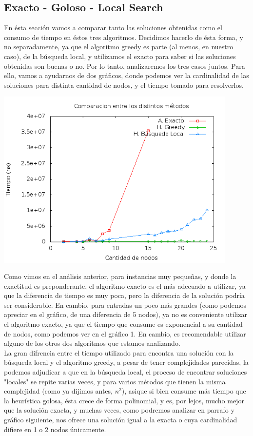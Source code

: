 \subsection{Exacto - Goloso - Local Search}
En ésta sección vamos a comparar tanto las soluciones obtenidas como el consumo de tiempo en éstos tres algoritmos. Decidimos hacerlo de ésta forma, y no separadamente, ya que el algoritmo greedy es parte (al menos, en nuestro caso), de la búsqueda local, y utilizamos el exacto para saber si las soluciones obtenidas son buenas o no. Por lo tanto, analizaremos los tres casos juntos. Para ello, vamos a ayudarnos de dos gráficos, donde podemos ver la cardinalidad de las soluciones para distinta cantidad de nodos, y el tiempo tomado para resolverlos. \\
\begin{center}
  \includegraphics[width=12cm]{./graficos/local_comparacion.png}
\end{center}
Como vimos en el análisis anterior, para instancias muy pequeñas, y donde la exactitud es preponderante, el algoritmo exacto es el más adecuado a utilizar, ya que la diferencia de tiempo es muy poca, pero la diferencia de la solución podría ser considerable. En cambio, para entradas un poco más grandes (como podemos apreciar en el gráfico, de una diferencia de 5 nodos), ya no es conveniente utilizar el algoritmo exacto, ya que el tiempo que consume es exponencial a su cantidad de nodos, como podemos ver en el gráfico 1. En cambio, es recomendable utilizar alguno de los otros dos algoritmos que estamos analizando. \\
La gran difrencia entre el tiempo utilizado para encontra una solución con la búsqueda local y el algoritmo greedy, a pesar de tener complejidades parecidas, la podemos adjudicar a que en la búsqueda local, el proceso de encontrar soluciones "locales" se repite varias veces, y para varios métodos que tienen la misma complejidad (como ya dijimos antes, $n^2$), asique si bien consume más tiempo que la heurística golosa, ésta crece de forma polinomial, y es, por lejos, mucho mejor que la solución exacta, y muchas veces, como podremos analizar en parrafo y gráfico siguiente, nos ofrece una solución igual a la exacta o cuya cardinalidad difiere en 1 o 2 nodos únicamente. \\
